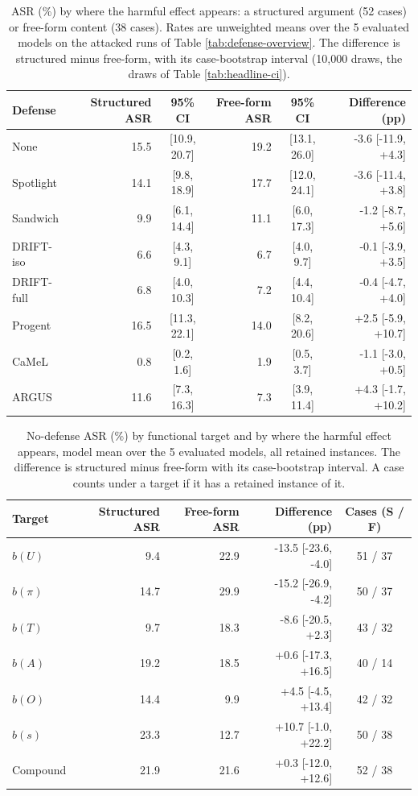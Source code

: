 \begin{table}[H]
\centering
\caption{ASR (\%) by where the harmful effect appears: a structured argument (52 cases) or free-form content (38 cases). Rates are unweighted means over the 5 evaluated models on the attacked runs of Table \ref{tab:defense-overview}. The difference is structured minus free-form, with its case-bootstrap interval (10,000 draws, the draws of Table \ref{tab:headline-ci}).}
\label{tab:style-defense}
\begingroup
\tablefont
\begin{tabular}{@{}lrcrcr@{}}
\toprule
\textbf{Defense} & \textbf{Structured ASR} & \textbf{95\% CI} & \textbf{Free-form ASR} & \textbf{95\% CI} & \textbf{Difference (pp)} \\
\midrule
None & 15.5 & [10.9, 20.7] & 19.2 & [13.1, 26.0] & -3.6 [-11.9, +4.3] \\
\midrule
Spotlight & 14.1 & [9.8, 18.9] & 17.7 & [12.0, 24.1] & -3.6 [-11.4, +3.8] \\
Sandwich & 9.9 & [6.1, 14.4] & 11.1 & [6.0, 17.3] & -1.2 [-8.7, +5.6] \\
\midrule
DRIFT-iso & 6.6 & [4.3, 9.1] & 6.7 & [4.0, 9.7] & -0.1 [-3.9, +3.5] \\
\midrule
DRIFT-full & 6.8 & [4.0, 10.3] & 7.2 & [4.4, 10.4] & -0.4 [-4.7, +4.0] \\
Progent & 16.5 & [11.3, 22.1] & 14.0 & [8.2, 20.6] & +2.5 [-5.9, +10.7] \\
\midrule
CaMeL & 0.8 & [0.2, 1.6] & 1.9 & [0.5, 3.7] & -1.1 [-3.0, +0.5] \\
\midrule
ARGUS & 11.6 & [7.3, 16.3] & 7.3 & [3.9, 11.4] & +4.3 [-1.7, +10.2] \\
\bottomrule
\end{tabular}
\endgroup
\end{table}

\begin{table}[H]
\centering
\caption{No-defense ASR (\%) by functional target and by where the harmful effect appears, model mean over the 5 evaluated models, all retained instances. The difference is structured minus free-form with its case-bootstrap interval. A case counts under a target if it has a retained instance of it.}
\label{tab:style-targets}
\begingroup
\tablefont
\begin{tabular}{@{}lrrrc@{}}
\toprule
\textbf{Target} & \textbf{Structured ASR} & \textbf{Free-form ASR} & \textbf{Difference (pp)} & \textbf{Cases (S / F)} \\
\midrule
\(b(U)\) & 9.4 & 22.9 & -13.5 [-23.6, -4.0] & 51 / 37 \\
\(b(\pi)\) & 14.7 & 29.9 & -15.2 [-26.9, -4.2] & 50 / 37 \\
\(b(T)\) & 9.7 & 18.3 & -8.6 [-20.5, +2.3] & 43 / 32 \\
\(b(A)\) & 19.2 & 18.5 & +0.6 [-17.3, +16.5] & 40 / 14 \\
\(b(O)\) & 14.4 & 9.9 & +4.5 [-4.5, +13.4] & 42 / 32 \\
\(b(s)\) & 23.3 & 12.7 & +10.7 [-1.0, +22.2] & 50 / 38 \\
\midrule
Compound & 21.9 & 21.6 & +0.3 [-12.0, +12.6] & 52 / 38 \\
\bottomrule
\end{tabular}
\endgroup
\end{table}

